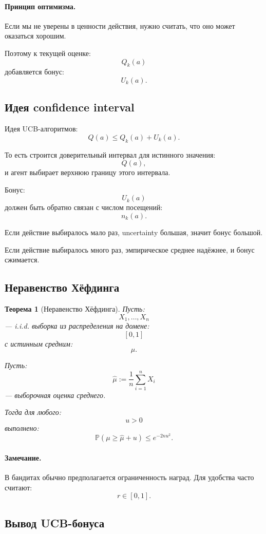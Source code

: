 \documentclass[12pt,a4paper]{article}
\newtheorem{theorem}{Теорема}
\begin{document}
\paragraph{Принцип оптимизма.}

Если мы не уверены в ценности действия, нужно считать, что оно может оказаться хорошим.

Поэтому к текущей оценке:
\[
Q_k(a)
\]
добавляется бонус:
\[
U_k(a).
\]

\subsection{Идея confidence interval}

Идея UCB-алгоритмов:
\[
Q(a)
\le
Q_k(a)+U_k(a).
\]

То есть строится доверительный интервал для истинного значения:
\[
Q(a),
\]
и агент выбирает верхнюю границу этого интервала.

Бонус:
\[
U_k(a)
\]
должен быть обратно связан с числом посещений:
\[
n_k(a).
\]

Если действие выбиралось мало раз, uncertainty большая, значит бонус большой.

Если действие выбиралось много раз, эмпирическое среднее надёжнее, и бонус сжимается.

\subsection{Неравенство Хёфдинга}

\begin{theorem}[Неравенство Хёфдинга]
Пусть:
\[
X_1,\ldots,X_n
\]
--- i.i.d. выборка из распределения на домене:
\[
[0,1]
\]
с истинным средним:
\[
\mu.
\]

Пусть:
\[
\hat\mu
:=
\frac{1}{n}
\sum_{i=1}^{n}
X_i
\]
--- выборочная оценка среднего.

Тогда для любого:
\[
u>0
\]
выполнено:
\[
\mathbb P
\left(
\mu\ge \hat\mu+u
\right)
\le
e^{-2nu^2}.
\]
\end{theorem}

\paragraph{Замечание.}

В бандитах обычно предполагается ограниченность наград. Для удобства часто считают:
\[
r\in[0,1].
\]

\subsection{Вывод UCB-бонуса}
\end{document}
